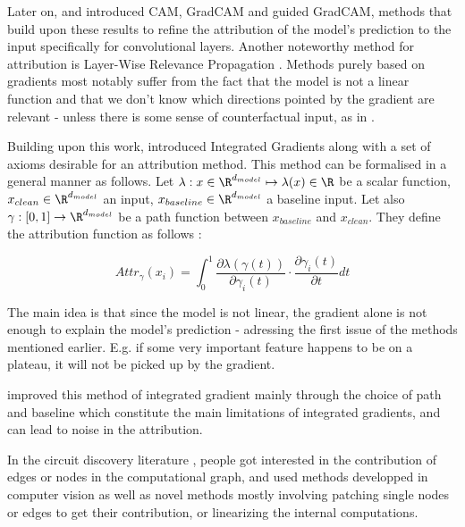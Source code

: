 \documentclass{article}
\begin{document}
Later on, \citet{zhou2016CAM} and \citet{selvaraju2017GradCAM} introduced CAM, GradCAM and guided GradCAM, methods that build upon these results to refine the attribution of the model's prediction to the input specifically for convolutional layers. Another noteworthy method for attribution is Layer-Wise Relevance Propagation \citep{montavon2019layerLRP}. Methods purely based on gradients most notably suffer from the fact that the model is not a linear function and that we don't know which directions pointed by the gradient are relevant - unless there is some sense of counterfactual input, as in \citep{syed2023attributionAtP}.

Building upon this work, \citet{sundararajan2017axiomaticIG} introduced Integrated Gradients along with a set of axioms desirable for an attribution method. This method can be formalised in a general manner as follows. Let $\lambda : x \in \R^{d_{model}} \mapsto \lambda(x) \in \R$ be a scalar function, $x_{clean} \in \R^{d_{model}}$ an input, $x_{baseline} \in \R^{d_{model}}$ a baseline input. Let also $\gamma : [0, 1] \rightarrow \R^{d_{model}}$ be a path function between $x_{baseline}$ and $x_{clean}$. They define the attribution function as follows :

$$ Attr_{\gamma}(x_i) = \int_{0}^{1} \frac{\partial \lambda(\gamma(t))}{\partial \gamma_i(t)} \cdot \frac{\partial \gamma_i(t)}{\partial t} dt $$

The main idea is that since the model is not linear, the gradient alone is not enough to explain the model's prediction - adressing the first issue of the methods mentioned earlier. E.g. if some very important feature happens to be on a plateau, it will not be picked up by the gradient.%
    
\citet{smilkov2017smoothgradIG, miglani2020investigatingIG, kapishnikov2021guidedGIG} improved this method of integrated gradient mainly through the choice of path and baseline which constitute the main limitations of integrated gradients, and can lead to noise in the attribution. %

In the circuit discovery literature \citep{olah2020zoomCircuits}, people got interested in the contribution of edges or nodes in the computational graph, and used methods developped in computer vision \citep{syed2023attributionCircuits, marks2024sparseCircuits} as well as novel methods \citep{wang2022interpretabilityCircuits, conmy2023automatedACDCCircuits, ferrando2024informationCircuits, he2024dictionaryCircuits} mostly involving patching single nodes or edges to get their contribution, or linearizing the internal computations.
\end{document}
